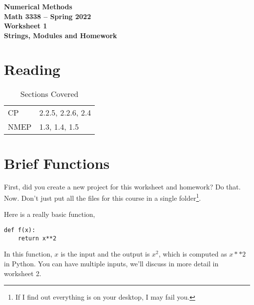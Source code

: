 \documentclass[11pt,letterpaper]{article}
\newcommand{\semester}{Spring 2022}
\begin{document}
\begin{center}
{\huge{\bf  Numerical Methods}} \\[1.5ex]
{\bf Math 3338 -- \semester}\\[1.5ex]
{\Large{\bf Worksheet 1\ \\[2ex] Strings, Modules and Homework}}\\
\end{center}
\vspace{2mm}

\section{Reading}

\begin{table}[!ht]
 \centering
 \begin{tabular}{ll}
   CP & 2.2.5, 2.2.6, 2.4 \\
 NMEP &  1.3, 1.4, 1.5
 \end{tabular}
\caption{Sections Covered}
\end{table}



\section{Brief Functions}
First, did you create a new project for this worksheet and homework? Do that. Now. Don't just put all the files for this course in a single folder\footnote{If I find out everything is on your desktop, I may fail you.}. 

Here is a really basic function,
\begin{verbatim}
def f(x):
    return x**2
\end{verbatim}

In this function, $x$ is the input and the output is $x^2$, which is computed as $x**2$ in Python. You can have multiple inputs, we'll discuss in more detail in worksheet 2.
    
    
\end{document}
